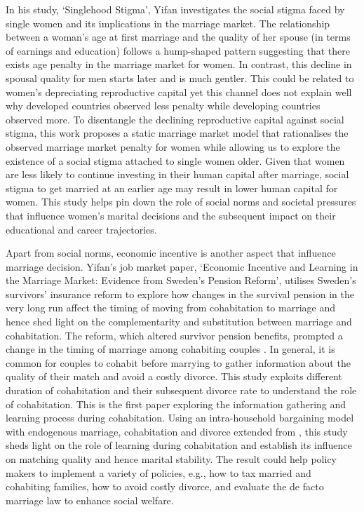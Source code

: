 \documentclass[12pt, letterpaper]{article}
\begin{document}
In his study, `Singlehood Stigma', Yifan investigates the social stigma faced by single women and its implications in the marriage market. The relationship between a woman's age at first marriage and the quality of her spouse (in terms of earnings and education) follows a hump-shaped pattern suggesting that there exists age penalty in the marriage market for women. In contrast, this decline in spousal quality for men starts later and is much gentler. This could be related to women’s depreciating reproductive capital \citep{Low2023} yet this channel does not explain well why developed countries observed less penalty while developing countries observed more. To disentangle the declining reproductive capital against social stigma, this work proposes a static marriage market model that rationalises the observed marriage market penalty for women while allowing us to explore the existence of a social stigma attached to single women older. Given that women are less likely to continue investing in their human capital after marriage, social stigma to get married at an earlier age may result in lower human capital for women. This study helps pin down the role of social norms and societal pressures that influence women's marital decisions and the subsequent impact on their educational and career trajectories. 


Apart from social norms, economic incentive is another aspect that influence marriage decision. Yifan's job market paper, `Economic Incentive and Learning in the Marriage Market: Evidence from Sweden’s Pension Reform', utilises Sweden's survivors' insurance reform to explore how changes in the survival pension in the very long run affect the timing of moving from cohabitation to marriage and hence shed light on the complementarity and substitution between marriage and cohabitation. The reform, which altered survivor pension benefits, prompted a change in the timing of marriage among cohabiting couples \citep{Persson2020}. In general, it is common for couples to cohabit before marrying to gather information about the quality of their match and avoid a costly divorce.  This study exploits different duration of cohabitation and their subsequent divorce rate to understand the role of cohabitation. This is the first paper exploring the information gathering and learning process during cohabitation. Using an intra-household bargaining model with endogenous marriage, cohabitation and divorce extended from \cite{Voena2015}, this study sheds light on the role of learning during cohabitation and establish its influence on matching quality and hence marital stability. The result could help policy makers to implement a variety of policies, e.g., how to tax married and cohabiting families, how to avoid costly divorce, and evaluate the de facto marriage law to enhance social welfare.
\end{document}
